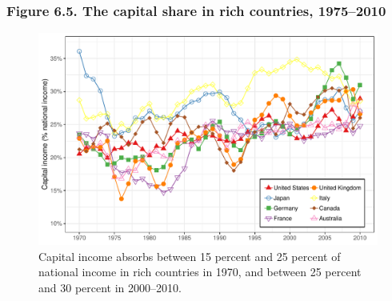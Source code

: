 \documentclass[t]{beamer}\usepackage[]{graphicx}\usepackage[]{color}
\newenvironment{knitrout}{}{} %
\begin{document}
\begin{frame}[label=Figure_6_5]
\frametitle{Figure 6.5. The capital share in rich countries, 1975--2010}
\begin{figure}[t]
\begin{minipage}[b]{\textwidth}
\centering
\begin{knitrout}\footnotesize
{}\color{fgcolor}

{\centering \includegraphics[width=1\linewidth]{figures/color/Figure_6_5} 

}



\end{knitrout}
\caption{Capital income absorbs between 15 percent and 25 percent of national income in rich countries in 1970, and between 25 percent and 30 percent in 2000--2010.}
\end{minipage}
\end{figure}
\end{frame}
\end{document}
